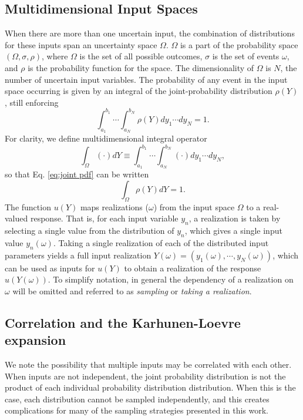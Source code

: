 \subsection{Multidimensional Input Spaces}
When there are more than one uncertain input, the combination of distributions for these inputs span an
uncertainty space $\Omega$. $\Omega$ is a part of the probability space $(\Omega,\sigma,\rho)$, where $\Omega$
is the set of all possible outcomes, $\sigma$ is the set of events $\omega$, and $\rho$ is the probability function for
the space.  The dimensionality of $\Omega$ is $N$,
the number of uncertain input variables.  The probability of any event in the input space occurring is given
by an integral of the joint-probability distribution $\rho(Y)$, still enforcing
\begin{equation} \label{eq:joint pdf}
  \int_{a_1}^{b_1}\cdots\int_{a_N}^{b_N} \rho(Y) dy_1\cdots dy_N = 1.
\end{equation}
For clarity, we define multidimensional integral operator
\begin{equation}\label{eq: no rho}
  \int_\Omega (\cdot)dY\equiv \int_{a_1}^{b_1}\cdots\int_{a_N}^{b_N} (\cdot) dy_1\cdots dy_N,
\end{equation}
so that Eq. \ref{eq:joint pdf} can be written
\begin{equation}
  \int_\Omega \rho(Y) dY = 1.
\end{equation}
The function $u(Y)$ maps realizations ($\omega$) from the input space $\Omega$ to a real-valued response.
That is, for each input variable $y_n$, a realization is taken by selecting a single value from the
distribution of $y_n$, which gives a single input value $y_n(\omega)$.  Taking a single realization of each of
the distributed input parameters yields a full input realization $Y(\omega)=(y_1(\omega),\cdots,y_N(\omega))$,
which can be used as inputs for
$u(Y)$ to obtain a realization of the response $u(Y(\omega))$.  To simplify notation, in general the
dependency of a realization on $\omega$ will be omitted and referred to as \emph{sampling} or \emph{taking a
realization}.

\subsection{Correlation and the Karhunen-Loevre expansion}\label{sec:KL}
We note the possibility that multiple inputs may be correlated with each other.  When inputs are not
independent, the joint probability distribution is not the product of each individual probability distribution
distribution.  When this is the case, each distribution cannot be sampled independently, and this
creates complications for many of the sampling strategies presented in this work.  

